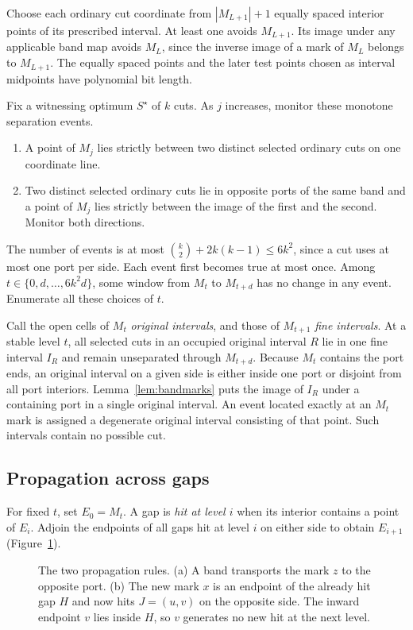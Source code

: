 \documentclass[10pt,letterpaper]{article}
\begin{document}
Choose each ordinary cut coordinate from \(|M_{L+1}|+1\) equally spaced interior points of its prescribed interval. At least one avoids \(M_{L+1}\). Its image under any applicable band map avoids \(M_L\), since the inverse image of a mark of \(M_L\) belongs to \(M_{L+1}\). The equally spaced points and the later test points chosen as interval midpoints have polynomial bit length.

Fix a witnessing optimum \(S^\star\) of \(k\) cuts. As \(j\) increases, monitor these monotone separation events.
\begin{enumerate}
\item A point of \(M_j\) lies strictly between two distinct selected ordinary cuts on one coordinate line.
\item Two distinct selected ordinary cuts lie in opposite ports of the same band and a point of \(M_j\) lies strictly between the image of the first and the second. Monitor both directions.
\end{enumerate}
The number of events is at most \(\binom{k}{2}+2k(k-1)\le 6k^2\), since a cut uses at most one port per side. Each event first becomes true at most once. Among \(t\in\{0,d,\ldots,6k^2d\}\), some window from \(M_t\) to \(M_{t+d}\) has no change in any event. Enumerate all these choices of \(t\).

Call the open cells of \(M_t\) \emph{original intervals}, and those of \(M_{t+1}\) \emph{fine intervals}. At a stable level \(t\), all selected cuts in an occupied original interval \(R\) lie in one fine interval \(I_R\) and remain unseparated through \(M_{t+d}\). Because \(M_t\) contains the port ends, an original interval on a given side is either inside one port or disjoint from all port interiors. Lemma~\ref{lem:bandmarks} puts the image of \(I_R\) under a containing port in a single original interval. An event located exactly at an \(M_t\) mark is assigned a degenerate original interval consisting of that point. Such intervals contain no possible cut.

\subsection{Propagation across gaps}
For fixed \(t\), set \(E_0=M_t\). A gap is \emph{hit at level \(i\)} when its interior contains a point of \(E_i\). Adjoin the endpoints of all gaps hit at level \(i\) on either side to obtain \(E_{i+1}\) (Figure~\ref{fig:propagation}).

\begin{figure}[H]
\centering

\caption{The two propagation rules. (a) A band transports the mark \(z\) to the opposite port. (b) The new mark \(x\) is an endpoint of the already hit gap \(H\) and now hits \(J=(u,v)\) on the opposite side. The inward endpoint \(v\) lies inside \(H\), so \(v\) generates no new hit at the next level.}
\label{fig:propagation}
\end{figure}
\end{document}
